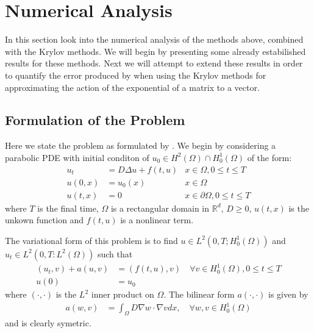 \section{Numerical Analysis}

In this section look into the numerical analysis of the methods above, combined with the Krylov methods.
We will begin by presenting some already estabilished results for these methods.
Next we will attempt to extend these results in order to quantify the error produced by when using the Krylov methods for approximating the action of the exponential of a matrix to a vector.

\subsection{Formulation of the Problem}
Here we state the problem as formulated by \cite{Huang2022}.
We begin by considering a parabolic PDE with initial conditon of $u_0 \in H^2(\Omega) \cap H^1_0(\Omega)$ of the form:
\begin{align*}
    u_t &= D \Delta u + f(t,u) &x\in \Omega, 0 \leq t \leq T\\
    u(0,x) &= u_0(x) &x\in \Omega\\
    u(t,x) &= 0 &x\in \partial \Omega, 0 \leq t \leq T
\end{align*}
where $T$ is the final time, $\Omega$ is a rectangular domain in $\mathbb{R}^d$, $D\geq 0$, $u(t,x)$ is the unkown function and $f(t,u)$ is a nonlinear term.

The variational form of this problem is to find $u\in L^2(0,T;H^1_0(\Omega))$ and $u_t \in L^2(0,T: L^2(\Omega))$ such that
\begin{align*}
    (u_t, v) + a(u, v) &= (f(t,u),v) \quad \forall v \in H^1_0(\Omega), 0\leq t \leq T\\
    u(0) &= u_0
\end{align*}
where $(\cdot,\cdot)$ is the $L^2$ inner product on $\Omega$.
The bilinear form $a(\cdot,\cdot)$ is given by
\begin{align*}
    a(w,v) &= \int_{\Omega} D \nabla w \cdot \nabla v dx, \quad \forall w, v \in H^1_0(\Omega)
\end{align*}
and is clearly symetric.

